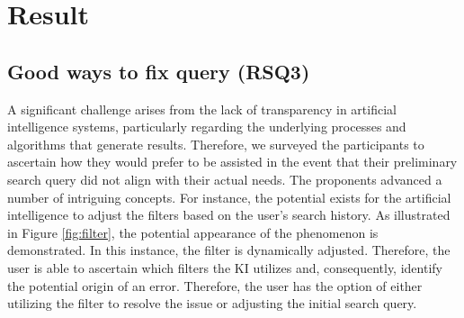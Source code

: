 \documentclass[../../submission.tex]{subfiles}
\begin{document}
\section{Result}

\subsection{Good ways to fix query (RSQ3)}
A significant challenge arises from the lack of transparency in artificial intelligence systems, 
particularly regarding the underlying processes and algorithms that generate results. 
Therefore, we surveyed the participants to ascertain how they would prefer to be assisted in the event that 
their preliminary search query did not align with their actual needs. The proponents advanced a number of 
intriguing concepts. For instance, the potential exists for the artificial intelligence to adjust the filters 
based on the user's search history. As illustrated in Figure \ref{fig:filter}, the potential appearance of the phenomenon is 
demonstrated. In this instance, the filter is dynamically adjusted. Therefore, the user is able to ascertain 
which filters the KI utilizes and, consequently, identify the potential origin of an error. Therefore, the user 
has the option of either utilizing the filter to resolve the issue or adjusting the initial search query.
\end{document}
